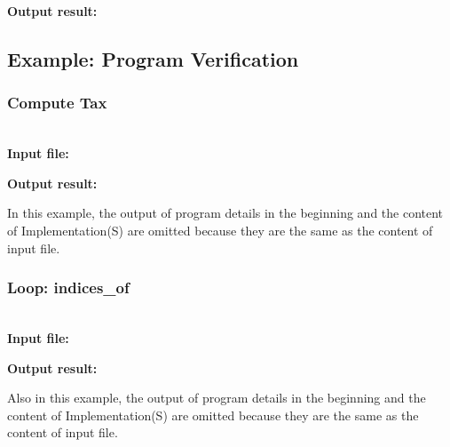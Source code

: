 {\bf Output result:}


\subsection{Example: Program Verification}
\subsubsection{Compute Tax}
~\\
{\bf Input file:}



{\bf Output result:}

In this example, the output of program details in the beginning and the content of Implementation(S) are omitted because they are the same as the content of input file.\\

\subsubsection{Loop: indices\_of}
~\\
{\bf Input file:}


{\bf Output result:}

Also in this example, the output of program details in the beginning and the content of Implementation(S) are omitted because they are the same as the content of input file.

